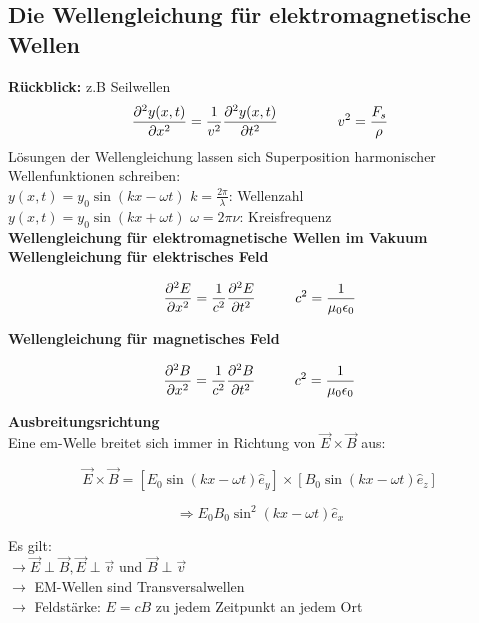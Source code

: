 \subsection{Die Wellengleichung für elektromagnetische Wellen}
\textbf{Rückblick:} z.B Seilwellen
\[
    \frac{\partial^2 y(x,t)}{\partial x^2} = \frac{1}{v^2}\frac{\partial^2 y(x,t)}{\partial t^2} \hspace{15mm} v^2 = \frac{F_s}{\rho}
\]
Lösungen der Wellengleichung lassen sich Superposition harmonischer Wellenfunktionen schreiben: \\[1ex]
$y(x,t) = y_0 \sin{(kx - \omega t)}$ \hspace{10mm} $k = \frac{2\pi}{\lambda}$: Wellenzahl \\
$y(x,t) = y_0 \sin{(kx + \omega t)}$ \hspace{10mm} $\omega = 2\pi\nu$: Kreisfrequenz \\[2ex]

\textbf{Wellengleichung für elektromagnetische Wellen im Vakuum} \\[1ex]
\hspace{5mm} \textbf{Wellengleichung für elektrisches Feld}
\begin{formulabox}
    \[
        \frac{\partial^2 E}{\partial x^2} = \frac{1}{c^2}\frac{\partial^2 E}{\partial t^2} \hspace{10mm} c^2 = \frac{1}{\mu_0 \epsilon_0}
    \]
\end{formulabox}

\hspace{5mm} \textbf{Wellengleichung für magnetisches Feld}
\begin{formulabox}
    \[
        \frac{\partial^2 B}{\partial x^2} = \frac{1}{c^2}\frac{\partial^2 B}{\partial t^2} \hspace{10mm} c^2 = \frac{1}{\mu_0 \epsilon_0}
    \]
\end{formulabox}

\textbf{Ausbreitungsrichtung} \\
Eine em-Welle breitet sich immer in Richtung von $\vec{E} \times \vec{B}$ aus:

\[
    \vec{E} \times \vec{B} = [E_0 \sin{(kx - \omega t)} \hat{e}_y] \times [B_0 \sin{(kx - \omega t)} \hat{e}_z]
\]
\begin{formulabox}
    \[
        \Rightarrow E_0 B_0 \sin^2{(kx - \omega t)\hat{e}_x}
    \]
\end{formulabox}
Es gilt: \\
\hspace{3mm} $\rightarrow \vec{E} \perp \vec{B}, \vec{E} \perp \vec{v}$ und $\vec{B} \perp \vec{v}$ \\
\hspace{3mm} $\rightarrow$ EM-Wellen sind Transversalwellen \\
\hspace{3mm} $\rightarrow$ Feldstärke: $E = cB$ zu jedem Zeitpunkt an jedem Ort

